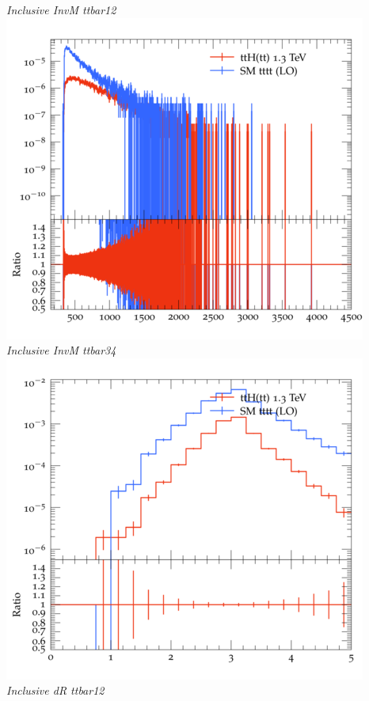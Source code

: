 \documentclass{beamer}
\begin{document}
\begin{frame}
\begin{columns}
\textit{\small Inclusive InvM ttbar12}
\includegraphics[width=\textwidth]{../plots/ttH_1300/tttt_ttH/Inclusive_InvM_ttbar34.png}\\
\textit{\small Inclusive InvM ttbar34}
\includegraphics[width=\textwidth]{../plots/ttH_1300/tttt_ttH/Inclusive_dR_ttbar12.png}\\
\textit{\small Inclusive dR ttbar12}
\end{columns}
\end{frame}
\end{document}
